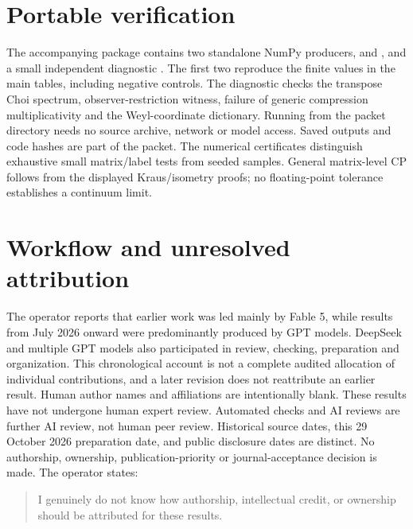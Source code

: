 \documentclass[11pt,a4paper]{article}
\theoremstyle{definition}
\theoremstyle{remark}
\begin{document}
\section{Portable verification}
The accompanying package contains two standalone NumPy producers,
 and , and a small
independent diagnostic . The first two reproduce the
finite values in the main tables, including negative controls. The diagnostic
checks the transpose Choi spectrum, observer-restriction witness, failure of
generic compression multiplicativity and the Weyl-coordinate dictionary.
Running  from the packet directory needs no source
archive, network or model access. Saved outputs and code hashes are part of the
packet. The numerical certificates distinguish exhaustive small matrix/label
tests from seeded samples. General matrix-level CP follows from the displayed
Kraus/isometry proofs; no floating-point tolerance establishes a continuum limit.

\section*{Workflow and unresolved attribution}
The operator reports that earlier work was led mainly by Fable 5, while results
from July 2026 onward were predominantly produced by GPT models. DeepSeek and
multiple GPT models also participated in review, checking, preparation and
organization. This chronological account is not a complete audited allocation
of individual contributions, and a later revision does not reattribute an earlier
result. Human author names and affiliations are intentionally blank. These
results have not undergone human expert review. Automated checks and AI reviews
are further AI review, not human peer review. Historical source dates, this
29 October 2026 preparation date, and public disclosure dates are distinct.
No authorship, ownership, publication-priority or journal-acceptance decision is
made. The operator states:
\begin{quote}
I genuinely do not know how authorship, intellectual credit, or ownership should be attributed for these results.
\end{quote}



\end{document}

